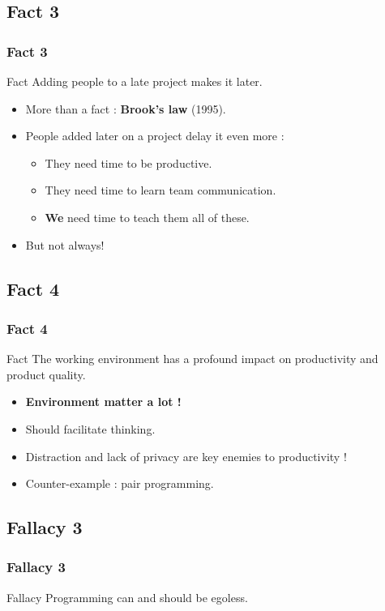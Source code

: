 \documentclass{beamer}
\begin{document}
\subsection{Fact 3}
\begin{frame}
    \frametitle{Fact 3}
    \begin{block}{Fact}
    Adding people to a late project makes it later.
    \end{block}
    \begin{itemize}
     \pause
     \item More than a fact : \textbf{Brook's law} (1995).
     \pause
     \item People added later on a project delay it even more :
     \pause
     \begin{itemize}
      \item They need time to be productive.
      \pause
      \item They need time to learn team communication.
      \pause
      \item \textbf{We} need time to teach them all of these.
     \end{itemize}
     \pause
     \item But not always!
    \end{itemize}

\end{frame}

\subsection{Fact 4}
\begin{frame}
    \frametitle{Fact 4}
    \begin{block}{Fact}
    The working environment has a profound impact on productivity and product
    quality.
    \end{block}
    \begin{itemize}
     \pause
     \item \textbf{Environment matter a lot !}
     \pause
     \item Should facilitate thinking.
     \pause
     \item Distraction and lack of privacy are key enemies to productivity !
     \pause
     \item Counter-example : pair programming.
    \end{itemize}

\end{frame}

\subsection{Fallacy 3}
\begin{frame}
    \frametitle{Fallacy 3}
    \begin{block}{Fallacy}
    Programming can and should be egoless.
    \end{block}
\end{frame}
\end{document}
